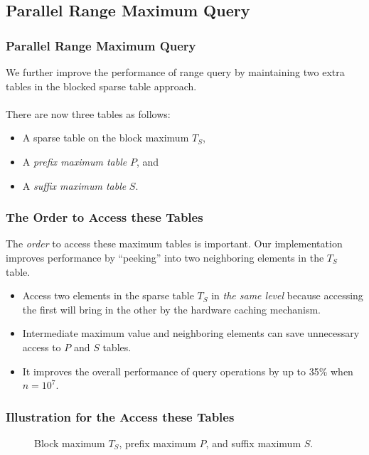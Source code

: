 \subsection{Parallel Range Maximum Query}
\begin{frame}
    \frametitle{Parallel Range Maximum Query}
    We further improve the performance of range query by maintaining two
	extra tables in the blocked sparse table approach.  
	\\~\\
	There are now three tables as follows:

	\begin{itemize}
		\setlength\itemsep{1em}
		\item
			A sparse table on the block maximum $T_S$, 
		\item
			A {\em prefix maximum table} $P$, and 
		\item
			A {\em suffix maximum table} $S$.
	\end{itemize}
\end{frame}

\begin{frame}
	\frametitle{The Order to Access these Tables}
	The {\em order} to access these maximum tables is important.  Our
	implementation improves performance by ``peeking'' into two
	neighboring elements in the $T_{S}$ table.
	\begin{itemize}
		\setlength\itemsep{1em}
		\item 
			Access two elements in the sparse table $T_S$ in {\em the
  			same level} because accessing the first will bring in the
  			other by the hardware caching mechanism.
  		\item
  			Intermediate maximum value and neighboring elements can save
			unnecessary access to $P$ and $S$ tables.
		\item
			It improves the overall performance of query operations by
			up to 35\% when $n = 10^7$.
	\end{itemize}
\end{frame}

\begin{withoutheadline}
\begin{frame}
	\frametitle{Illustration for the Access these Tables}
	\begin{center}
	\scalebox{0.7} { \begin{minipage}{1.5\textwidth}
				\begin{figure}[!thb]
				  \centering {}  \caption{Block maximum $T_S$, prefix maximum $P$, and suffix
				    maximum $S$.}
				  \label{fig:compressed-sp-opt}
				\end{figure}
				\end{minipage}
		}
	\end{center}
\end{frame}
\end{withoutheadline}

